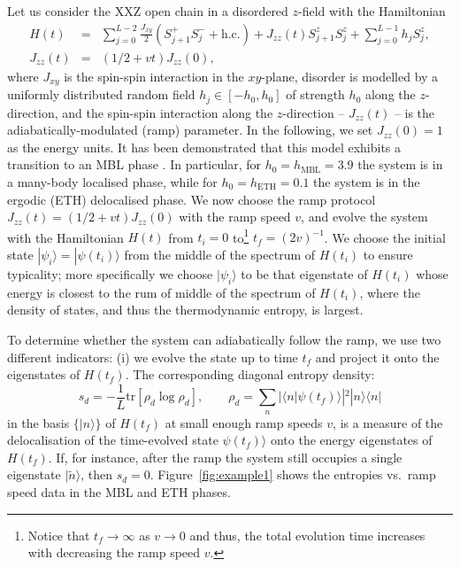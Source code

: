 \documentclass{SciPost}
\newcommand\0{\scalebox{-1}[1]{0}}
\begin{document}
Let us consider the XXZ open chain in a disordered $z$-field with the Hamiltonian
\begin{eqnarray}
H(t) &=& \sum_{j=0}^{L-2}\frac{J_{xy}}{2}\left(S^+_{j+1}S^-_{j} + \mathrm{h.c.}\right) + J_{zz}(t)S^z_{j+1}S^z_{j} + \sum_{j=0}^{L-1}h_jS^z_{j},\nonumber\\
J_{zz}(t) &=&(1/2 + vt)J_{zz}(0),
\label{eq:H_XXZ}
\end{eqnarray}
where $J_{xy}$ is the spin-spin interaction in the $xy$-plane, disorder is modelled by a uniformly distributed random field $h_j\in[-h_0,h_0]$ of strength $h_0$ along the $z$-direction, and the spin-spin interaction along the $z$-direction -- $J_{zz}(t)$ -- is the adiabatically-modulated (ramp) parameter. In the following, we set $J_{zz}(0) = 1$ as the energy units. It has been demonstrated that this model exhibits a transition to an MBL phase \cite{Luitz15}. In particular, for $h_0=h_\mathrm{MBL}=3.9$ the system is in a many-body localised phase, while for $h_0=h_\mathrm{ETH}=0.1$ the system is in the ergodic (ETH) delocalised phase. We now choose the ramp protocol $J_{zz}(t)=(1/2 + vt)J_{zz}(0)$ with the ramp speed $v$, and evolve the system with the Hamiltonian $H(t)$ from $t_i=0$ to\footnote{Notice that $t_f\to\infty$ as $v\to 0$ and thus, the total evolution time increases with decreasing the ramp speed $v$.} $t_f=(2v)^{-1}$. We choose the initial state $|\psi_i\rangle=|\psi(t_i)\rangle$ from the middle of the spectrum of $H(t_i)$ to ensure typicality; more specifically we choose $|\psi_i\rangle$ to be that eigenstate of $H(t_i)$ whose energy is closest to the rum of middle of the spectrum of $H(t_i)$, where the density of states, and thus the thermodynamic entropy, is largest.  

To determine whether the system can adiabatically follow the ramp, we use two different indicators: (i) we evolve the state up to time $t_f$ and project it onto the eigenstates of $H(t_f)$. The corresponding diagonal entropy density:
\begin{equation}
s_d = -\frac{1}{L}\mathrm{tr}\left[\rho_d\log\rho_d\right], \qquad \rho_d=\sum_n |\langle n|\psi(t_f)\rangle|^2 |n\rangle\langle n|
\end{equation}
in the basis $\{|n\rangle\}$ of $H(t_f)$ at small enough ramp speeds $v$, is a measure of the delocalisation of the time-evolved state $\psi(t_f)\rangle$ onto the energy eigenstates of $H(t_f)$. If, for instance, after the ramp the system still occupies a single eigenstate $|\tilde n\rangle$, then $s_d=0$. Figure~\ref{fig:example1} shows the entropies vs.~ramp speed data in the MBL and ETH phases.
\end{document}
